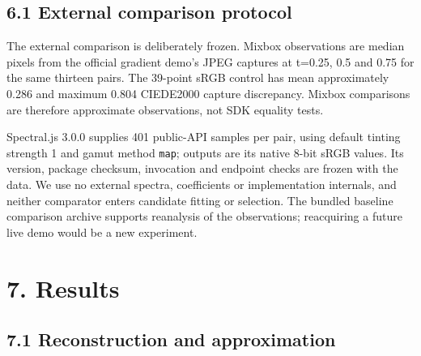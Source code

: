 \documentclass[
  10pt,
  twocolumn]{article}
\begin{document}
\hypertarget{external-comparison-protocol}{%
\subsection{6.1 External comparison
protocol}\label{external-comparison-protocol}}

The external comparison is deliberately frozen. Mixbox observations are
median pixels from the official gradient demo's JPEG captures at t=0.25,
0.5 and 0.75 for the same thirteen pairs. The 39-point sRGB control has
mean approximately 0.286 and maximum 0.804 CIEDE2000 capture
discrepancy. Mixbox comparisons are therefore approximate observations,
not SDK equality tests.

Spectral.js 3.0.0 supplies 401 public-API samples per pair, using
default tinting strength 1 and gamut method \texttt{map}; outputs are
its native 8-bit sRGB values. Its version, package checksum, invocation
and endpoint checks are frozen with the data. We use no external
spectra, coefficients or implementation internals, and neither
comparator enters candidate fitting or selection. The bundled baseline
comparison archive supports reanalysis of the observations; reacquiring
a future live demo would be a new experiment.

\hypertarget{results}{%
\section{7. Results}\label{results}}

\hypertarget{reconstruction-and-approximation}{%
\subsection{7.1 Reconstruction and
approximation}\label{reconstruction-and-approximation}}
\end{document}
